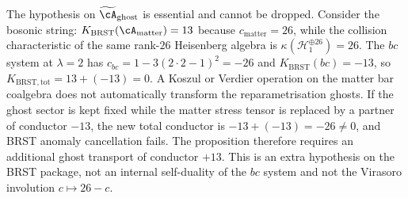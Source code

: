 \begin{remark}
\label{rem:koszul-brst-scoping}
The hypothesis on $\widetilde{\cA}_{\mathrm{ghost}}$ is essential and
cannot be dropped. Consider the bosonic string:
$K_{\mathrm{BRST}}(\cA_{\mathrm{matter}})=13$ because
$c_{\mathrm{matter}}=26$, while the collision characteristic of the
same rank-$26$ Heisenberg algebra is
$\kappa(\mathcal H^{\oplus 26}_1)=26$. The $bc$ system at
$\lambda=2$ has
$c_{bc}=1-3(2{\cdot}2{-}1)^2=-26$ and
$K_{\mathrm{BRST}}(bc)=-13$, so
$K_{\mathrm{BRST,tot}}=13+(-13)=0$. A Koszul or Verdier operation on
the matter bar coalgebra does not automatically transform the
reparametrisation ghosts. If the ghost sector is kept fixed while the
matter stress tensor is replaced by a partner of conductor $-13$, the
new total conductor is $-13+(-13)=-26\neq0$, and BRST anomaly
cancellation fails. The proposition therefore requires an additional
ghost transport of conductor $+13$. This is an extra hypothesis on the
BRST package, not an internal self-duality of the $bc$ system and not
the Virasoro involution $c\mapsto26-c$.
\end{remark}

